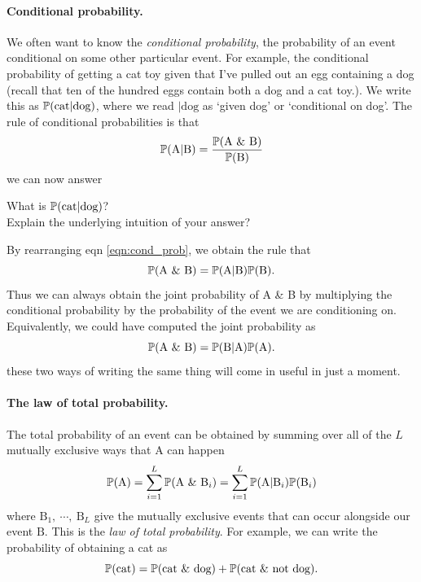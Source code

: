 \paragraph{Conditional probability.}
We often want to know the \emph{conditional probability}, the probability of an event conditional on some
other particular event. For example, the conditional probability of getting a cat toy
given that I've pulled out an egg containing a dog (recall that ten of the hundred eggs contain both a dog and a cat toy.). 
We write this as $\P(\textrm{cat} | \textrm{dog})$, where we read $|
\textrm{dog}$ as `given dog' or `conditional on dog'.  The rule of conditional probabilities is that
\begin{equation}
\P(\textrm{A} | \textrm{B}) = \frac{\P(\textrm{A \& B} )}{\P(\textrm{B})}  \label{eqn:cond_prob}
\end{equation}
we can now answer
\begin{question}{} \label{question:cond}
What is $ \P(\textrm{cat} | \textrm{dog})$?\\
Explain the underlying intuition of your answer? \\
\end{question}
By rearranging eqn \eqref{eqn:cond_prob}, we obtain the rule that
\begin{equation}
\P(\textrm{A \& B}) = \P(\textrm{A} | \textrm{B}) \P(\textrm{B}) .
\end{equation}
Thus we can always obtain the joint probability of A \& B by
multiplying the conditional probability by the probability of the
event we are conditioning on. Equivalently, we could have computed the
joint probability as
\begin{equation}
\P(\textrm{A \& B}) = \P(\textrm{B} | \textrm{A}) \P(\textrm{A}) .
\end{equation}
these two ways of writing the same thing will come in useful in just a
moment.

\paragraph{The law of total
  probability.}
The total probability of an event can be obtained by summing over
all of the $L$ mutually exclusive ways that A can happen
\begin{equation}
  \P(\textrm{A})  = \sum_{i=1}^L \P(\textrm{A \& B$_i$}) = \sum_{i=1}^L \P(\textrm{A} | \textrm{B}_i) \P(\textrm{B}_i)  \label{eqn:law_tot_prob}
\end{equation}
where $\textrm{B}_1,~\cdots,~\textrm{B}_L$ give the mutually exclusive events
that can occur alongside our event $\textrm{B}$. This is the \emph{law of total
  probability}. For example, we can write the probability of obtaining
a cat as
\begin{equation}
 \P(\textrm{cat}) = \P(\textrm{cat \& dog}) + \P(\textrm{cat \& not dog}). 
\end{equation}

